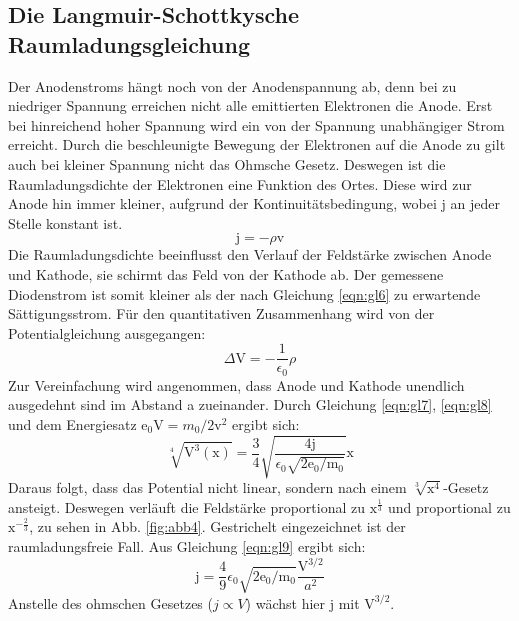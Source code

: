 \subsection{Die Langmuir-Schottkysche Raumladungsgleichung}
Der Anodenstroms hängt noch von der Anodenspannung ab, denn bei zu niedriger Spannung erreichen nicht alle emittierten Elektronen die Anode.
Erst bei hinreichend hoher Spannung wird ein von der Spannung unabhängiger Strom erreicht.
Durch die beschleunigte Bewegung der Elektronen auf die Anode zu gilt auch bei kleiner Spannung nicht das Ohmsche Gesetz.
Deswegen ist die Raumladungsdichte \rho der Elektronen eine Funktion des Ortes.
Diese wird zur Anode hin immer kleiner, aufgrund der Kontinuitätsbedingung, wobei j an jeder Stelle konstant ist.
\begin{equation}
    \text{j} = - \rho \text{v}
    \label{eqn:gl7}
\end{equation}
Die Raumladungsdichte \rho beeinflusst den Verlauf der Feldstärke zwischen Anode und Kathode, sie schirmt das Feld von der Kathode ab.
Der gemessene Diodenstrom ist somit kleiner als der nach Gleichung \eqref{eqn:gl6} zu erwartende Sättigungsstrom.
Für den quantitativen Zusammenhang wird von der Potentialgleichung ausgegangen:
\begin{equation}
    \Delta \text{V} = - \frac{1}{\epsilon_0} \rho
    \label{eqn:gl8}
\end{equation}
Zur Vereinfachung wird angenommen, dass Anode und Kathode unendlich ausgedehnt sind im Abstand a zueinander.
Durch Gleichung \eqref{eqn:gl7}, \eqref{eqn:gl8} und dem Energiesatz $\text{e}_0 \text{V} = m_0/2 \text{v}^2$ ergibt sich:
\begin{equation}
    \sqrt[4]{\text{V}^3(\text{x})} = \frac{3}{4} \sqrt{\frac{4 \text{j}}{\epsilon_0 \sqrt{2 \text{e}_0/\text{m}_0}}}\text{x}
    \label{eqn:gl9}
\end{equation}
Daraus folgt, dass das Potential nicht linear, sondern nach einem $\sqrt[3]{\text{x}^4}$-Gesetz ansteigt.
Deswegen verläuft die Feldstärke proportional zu $\text{x}^{\frac{1}{3}}$ und \rho proportional zu $\text{x}^{-\frac{2}{3}}$, zu sehen in Abb. \ref{fig:abb4}.
Gestrichelt eingezeichnet ist der raumladungsfreie Fall.
Aus Gleichung \ref{eqn:gl9} ergibt sich:
\begin{equation}
    \text{j} = \frac{4}{9} \epsilon_0 \sqrt{2 \text{e}_0/\text{m}_0} \frac{\text{V}^{3/2}}{a^2}
    \label{eqn:gl10}
\end{equation}
Anstelle des ohmschen Gesetzes ($j \propto V$) wächst hier j mit $\text{V}^{3/2}$.
